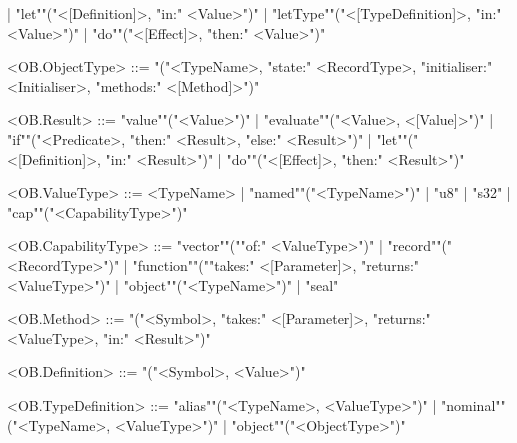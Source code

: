 \documentclass[main.tex]{subfiles}
\begin{document}
\begin{grammar}
						| "let""("<[Definition]>, "in:" <Value>")"
						| "letType""("<[TypeDefinition]>, "in:" <Value>")"
						| "do""("<[Effect]>, "then:" <Value>")"
				\par
				<OB.ObjectType> ::=
							"("<TypeName>, "state:" <RecordType>, "initialiser:" <Initialiser>, "methods:" <[Method]>")"
				\par
				<OB.Result> ::=
						"value""("<Value>")"
						| "evaluate""("<Value>, <[Value]>")"
						| "if""("<Predicate>, "then:" <Result>, "else:" <Result>")"
						| "let""("<[Definition]>, "in:" <Result>")"
						| "do""("<[Effect]>, "then:" <Result>")"
				\par
				<OB.ValueType> ::=
								<TypeName> |
						"named""("<TypeName>")"
						| "u8"
						| "s32"
						| "cap""("<CapabilityType>")"
				\par
				<OB.CapabilityType> ::=
						"vector""(""of:" <ValueType>")"
						| "record""("<RecordType>")"
						| "function""(""takes:" <[Parameter]>, "returns:" <ValueType>")"
						| "object""("<TypeName>")"
						| "seal"
				\par
				<OB.Method> ::=
							"("<Symbol>, "takes:" <[Parameter]>, "returns:" <ValueType>, "in:" <Result>")"
				\par
				<OB.Definition> ::=
							"("<Symbol>, <Value>")"
				\par
				<OB.TypeDefinition> ::=
						"alias""("<TypeName>, <ValueType>")"
						| "nominal""("<TypeName>, <ValueType>")"
						| "object""("<ObjectType>")"
				\par
\end{grammar}
\par
\end{document}
